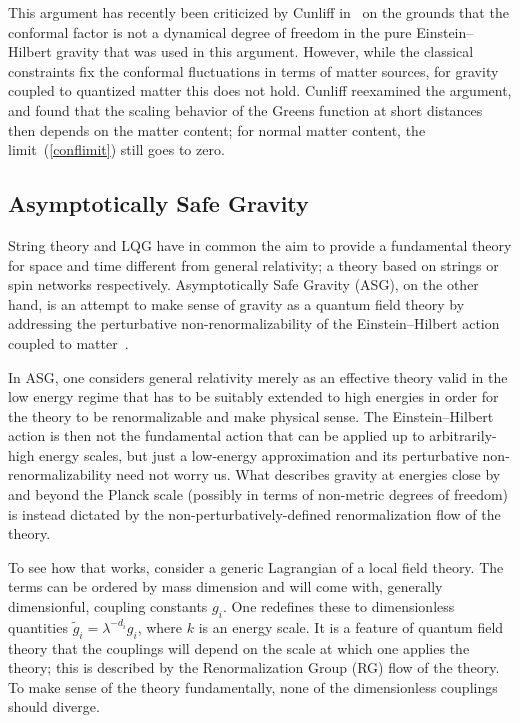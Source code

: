 \documentclass{article}
\begin{document}
This argument has recently been criticized by Cunliff in~\cite{Cunliff:2012zb} on the grounds that the 
conformal factor is not a dynamical degree of freedom in the pure Einstein--Hilbert gravity that was used in this
argument. However, while the classical
constraints fix the conformal fluctuations in terms of matter sources, for gravity coupled to
quantized matter this does not hold. Cunliff reexamined the argument, and found that the scaling behavior of
the Greens function at short distances then depends on the matter content; for normal matter 
content, the limit~(\ref{conflimit}) still goes to zero. 


\subsection{Asymptotically Safe Gravity}
\label{asg}

String theory and LQG have in common the aim to provide
a fundamental theory for space and time different from general relativity; a theory 
based on strings or spin networks respectively. Asymptotically Safe
Gravity ({\sc ASG}), on the other hand, is an attempt to make sense of 
gravity as a quantum field theory by addressing the 
perturbative non-renormalizability of the Einstein--Hilbert action coupled to matter~\cite{tHooft:1974bx}. 

In {\sc ASG}, one considers general relativity merely as an effective theory
valid in the low energy regime that has to be suitably extended to high
energies in order for the theory to be renormalizable and make physical sense.
The Einstein--Hilbert action is then not  
the fundamental action that can be applied up to arbitrarily-high energy scales, but just
a low-energy approximation and its perturbative non-renormalizability need not worry us. 
What describes gravity at energies close by
and beyond the Planck scale (possibly in terms of non-metric 
degrees of freedom) is instead dictated by the non-perturbatively-defined 
renormalization flow of the theory. 

To see how that works, consider a generic Lagrangian of a local field
theory. The terms can be ordered by mass dimension and will come with,
generally dimensionful, coupling constants $g_i$. One redefines these
to dimensionless quantities $\tilde g_i = \lambda^{-d_i} g_i$, where $k$ is
an energy scale. It is a feature
of quantum field theory that the couplings will depend on the scale
at which one applies the theory; this is
described by the Renormalization Group (RG) 
flow of the theory. To make sense of the theory fundamentally, none of the dimensionless
couplings should diverge.  
\end{document}

